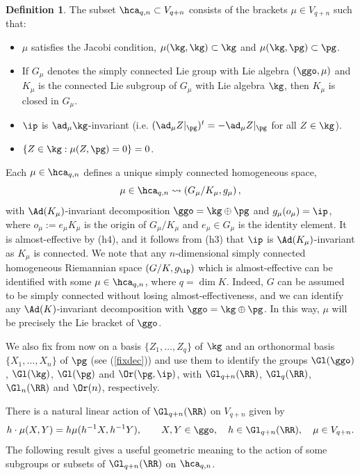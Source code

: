 \documentclass[11pt]{amsart}
\theoremstyle{plain}
\theoremstyle{definition}
\newtheorem{definition}[theorem]{Definition}
\theoremstyle{remark}
\begin{document}
\begin{definition}\label{hqn} The subset $\hca_{q,n}\subset V_{q+n}$ consists of the brackets $\mu\in V_{q+n}$ such that:
\begin{itemize}
\item [(h1)]  $\mu$ satisfies the Jacobi condition, $\mu(\kg,\kg)\subset\kg$ and $\mu(\kg,\pg)\subset\pg$.

\item[(h2)] If $G_\mu$ denotes the simply connected Lie group with Lie algebra $(\ggo,\mu)$ and $K_\mu$ is the connected Lie subgroup of $G_\mu$ with Lie algebra $\kg$, then $K_\mu$ is closed in $G_\mu$.

\item[(h3)] $\ip$ is $\ad_{\mu}{\kg}$-invariant (i.e. $(\ad_{\mu}{Z}|_{\pg})^t=-\ad_{\mu}{Z}|_{\pg}$ for all $Z\in\kg$).

\item[(h4)] $\{ Z\in\kg:\mu(Z,\pg)=0\}=0$.
\end{itemize}
\end{definition}

Each $\mu\in\hca_{q,n}$ defines a unique simply connected homogeneous space,
\begin{equation}\label{hsmu}
\mu\in\hca_{q,n}\rightsquigarrow\left(G_{\mu}/K_{\mu},g_\mu\right),
\end{equation}
with $\Ad(K_{\mu})$-invariant decomposition $\ggo=\kg\oplus\pg$ and $g_\mu(o_\mu)=\ip$, where $o_\mu:=e_\mu K_\mu$ is the origin of $G_\mu/K_\mu$ and $e_\mu\in G_\mu$ is the identity element.  It is almost-effective by (h4), and it follows from (h3) that $\ip$ is $\Ad(K_{\mu})$-invariant as $K_{\mu}$ is connected.  We note that any $n$-dimensional simply connected homogeneous Riemannian space $(G/K,g_{\ip})$ which is almost-effective can be identified with some $\mu\in\hca_{q,n}$, where $q=\dim{K}$.  Indeed, $G$ can be assumed to be simply connected without losing almost-effectiveness, and we can identify any $\Ad(K)$-invariant decomposition with $\ggo=\kg\oplus\pg$. In this way, $\mu$ will be precisely the Lie bracket of $\ggo$.

We also fix from now on a basis $\{ Z_1,\dots,Z_q\}$ of $\kg$ and an orthonormal basis $\{ X_1,\dots,X_n\}$ of $\pg$ (see (\ref{fixdec})) and use them to identify the groups $\Gl(\ggo)$, $\Gl(\kg)$, $\Gl(\pg)$ and $\Or(\pg,\ip)$, with $\Gl_{q+n}(\RR)$, $\Gl_q(\RR)$, $\Gl_n(\RR)$ and $\Or(n)$, respectively.

There is a natural linear action of $\Gl_{q+n}(\RR)$ on $V_{q+n}$ given by
\begin{equation}\label{action}
h\cdot\mu(X,Y)=h\mu(h^{-1}X,h^{-1}Y), \qquad X,Y\in\ggo, \quad h\in\Gl_{q+n}(\RR),\quad \mu\in V_{q+n}.
\end{equation}
The following result gives a useful geometric meaning to the action of some subgroups or subsets of $\Gl_{q+n}(\RR)$ on $\hca_{q,n}$.
\end{document}
